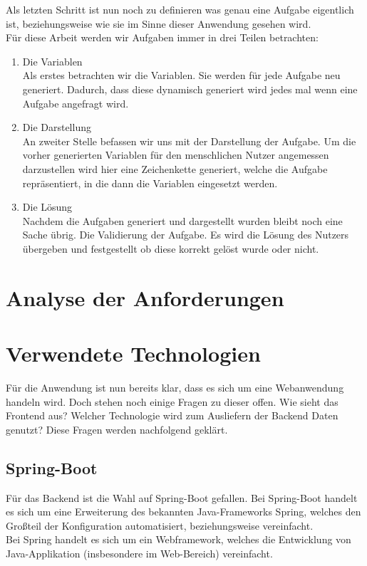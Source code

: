 Als letzten Schritt ist nun noch zu definieren was genau eine Aufgabe eigentlich ist, beziehungsweise wie sie im Sinne dieser Anwendung gesehen wird. \\
Für diese Arbeit werden wir Aufgaben immer in drei Teilen betrachten:
\begin{enumerate}
\item Die Variablen \\
Als erstes betrachten wir die Variablen. Sie werden für jede Aufgabe neu generiert. Dadurch, dass diese dynamisch generiert wird jedes mal wenn eine Aufgabe angefragt wird.
\item Die Darstellung \\
An zweiter Stelle befassen wir uns mit der Darstellung der Aufgabe. Um die vorher generierten Variablen für den menschlichen Nutzer angemessen darzustellen wird hier eine Zeichenkette generiert, welche die Aufgabe repräsentiert, in die dann die Variablen eingesetzt werden.
\item Die Lösung \\
Nachdem die Aufgaben generiert und dargestellt wurden bleibt noch eine Sache übrig. Die Validierung der Aufgabe. Es wird die Lösung des Nutzers übergeben und festgestellt ob diese korrekt gelöst wurde oder nicht.
\end{enumerate}


\section{Analyse der Anforderungen}

\section{Verwendete Technologien}

Für die Anwendung ist nun bereits klar, dass es sich um eine Webanwendung handeln wird. Doch stehen noch einige Fragen zu dieser offen. Wie sieht das Frontend aus? Welcher Technologie wird zum Ausliefern der Backend Daten genutzt? Diese Fragen werden nachfolgend geklärt.

\subsection{Spring-Boot}

Für das Backend ist die Wahl auf Spring-Boot gefallen. Bei Spring-Boot handelt es sich um eine Erweiterung des bekannten Java-Frameworks Spring, welches den Großteil der Konfiguration automatisiert, beziehungsweise vereinfacht. \\
Bei Spring handelt es sich um ein Webframework, welches die Entwicklung von Java-Applikation (insbesondere im Web-Bereich) vereinfacht. \\

